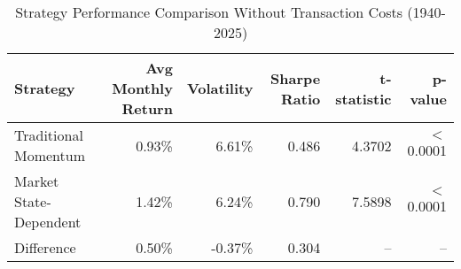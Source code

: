 \begin{table}[htbp]
\caption{Strategy Performance Comparison Without Transaction Costs (1940-2025)}
\label{tab:strategy_comparison_no_costs}
\begin{tabular}{lrrrrr}
\toprule
Strategy & Avg Monthly Return & Volatility & Sharpe Ratio & t-statistic & p-value \\
\midrule
Traditional Momentum & 0.93\% & 6.61\% & 0.486 & 4.3702 & $<$ 0.0001 \\
Market State-Dependent & 1.42\% & 6.24\% & 0.790 & 7.5898 & $<$ 0.0001 \\
Difference & 0.50\% & -0.37\% & 0.304 & -- & -- \\
\bottomrule
\end{tabular}
\end{table}
